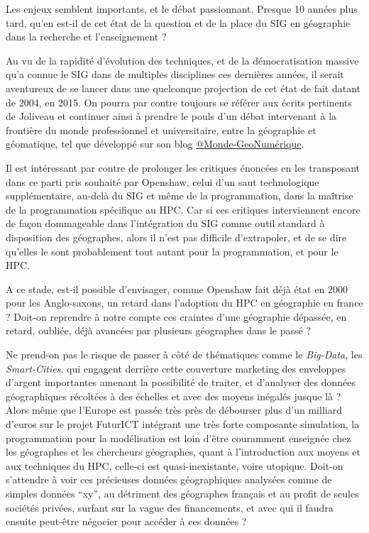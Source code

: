 Les enjeux semblent importants, et le débat passionnant. Presque 10 années plus tard, qu'en est-il de cet état de la question et de la place du SIG en géographie dans la recherche et l'enseignement ?

Au vu de la rapidité d'évolution des techniques, et de la démocratisation massive qu'a connue le SIG dans de multiples disciplines ces dernières années, il serait aventureux de se lancer dans une quelconque projection de cet état de fait datant de 2004, en 2015. On pourra par contre toujours se référer aux écrits pertinents de Joliveau et continuer ainsi à prendre le pouls d'un débat intervenant à la frontière du monde professionnel et universitaire, entre la géographie et géomatique, tel que développé sur son blog \href{https://mondegeonumerique.wordpress.com/}{@Monde-GeoNumérique}.

Il est intéressant par contre de prolonger les critiques énoncées en les transposant dans ce parti pris souhaité par Openshaw, celui d'un saut technologique supplémentaire, au-delà du SIG et même de la programmation, dans la maîtrise de la programmation spécifique au HPC. Car si ces critiques interviennent encore de façon dommageable dans l'intégration du SIG comme outil standard à disposition des géographes, alors il n'est pas difficile d'extrapoler, et de se dire qu'elles le sont probablement tout autant pour la programmation, et pour le HPC.

A ce stade, est-il possible d'envisager, comme Openshaw fait déjà état en 2000 pour les Anglo-saxons, un retard dans l'adoption du HPC en géographie en france ? Doit-on reprendre à notre compte ces craintes d'une géographie dépassée, en retard, oubliée, déjà avancées par plusieurs géographes dans le passé  ?

Ne prend-on pas le risque de passer à côté de thématiques comme le \textit{Big-Data}, les \textit{Smart-Cities}, qui engagent derrière cette couverture marketing des enveloppes d'argent importantes amenant la possibilité de traiter, et d’analyser des données géographiques récoltées à des échelles et avec des moyens inégalés jusque là ? Alors même que l’Europe est passée très près de débourser plus d'un milliard d’euros sur le projet FuturICT intégrant une très forte composante simulation, la programmation pour la modélisation est loin d’être couramment enseignée chez les géographes et les chercheurs géographes, quant à l'introduction aux moyens et aux techniques du HPC, celle-ci est quasi-inexistante, voire utopique. Doit-on s’attendre à voir ces précieuses données géographiques analysées comme de simples données \enquote{xy}, au détriment des géographes français et au profit de seules sociétés privées, surfant sur la vague des financements, et avec qui il faudra ensuite peut-être négocier pour accéder à ces données ?

